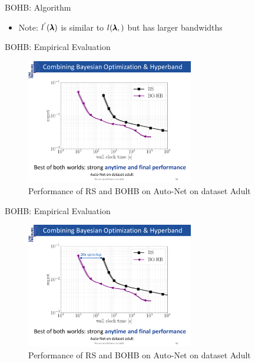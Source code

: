 \begin{frame}{BOHB: Algorithm}
\pause
\begin{itemize}
	\item Note: $l^{'}(\pmb{\lambda})$ is similar to $l(\pmb{\lambda},)$ but has larger bandwidths
\end{itemize}

\end{frame}
\begin{frame}{BOHB: Empirical Evaluation}
\begin{figure}
    \centering
    \includegraphics[width=0.65\textwidth]{../w07_hpo_speedup/images/bohb/BOHB_1.pdf}
    \caption{Performance of RS and BOHB on Auto-Net on dataset Adult}
\end{figure}

\end{frame}
\begin{frame}{BOHB: Empirical Evaluation}
\begin{figure}
    \centering
    \includegraphics[width=0.65\textwidth]{../w07_hpo_speedup/images/bohb/BOHB_2.pdf}
    \caption{Performance of RS and BOHB on Auto-Net on dataset Adult}
\end{figure}

\end{frame}

